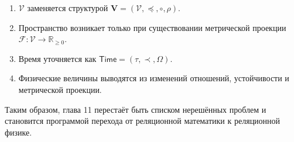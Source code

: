 \documentclass[12pt,a4paper]{article}
\newcommand{\Values}{\mathcal V}
\newcommand{\Vstruct}{\mathbf V}
\newcommand{\Time}{\mathsf{Time}}
\newcommand{\Metric}{\mathcal F}
\begin{document}
\begin{enumerate}
    \item \(\Values\) заменяется структурой \(\Vstruct=(\Values,\preceq,\circ,\rho)\).
    \item Пространство возникает только при существовании метрической проекции \(\Metric:\Values\to\mathbb R_{\ge0}\).
    \item Время уточняется как \(\Time=(\tau,\prec,\Omega)\).
    \item Физические величины выводятся из изменений отношений, устойчивости и метрической проекции.
\end{enumerate}

Таким образом, глава 11 перестаёт быть списком нерешённых проблем и становится программой перехода от реляционной математики к реляционной физике.
\end{document}
